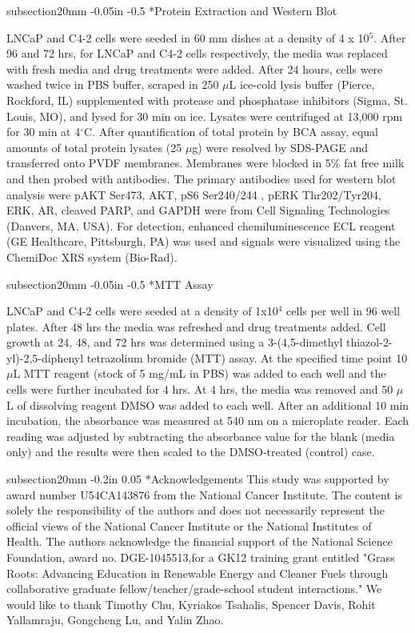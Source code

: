 \documentclass[12pt]{article}
\makeatletter
\renewcommand\subsection{\@startsection
	{subsection}{2}{0mm}
	{-0.05in}
	{-0.5\baselineskip}
	{\normalfont\normalsize\bfseries}}
\renewcommand\section{\@startsection
	{subsection}{2}{0mm}
	{-0.2in}
	{0.05\baselineskip}
	{\normalfont\large\bfseries}}
\makeatother
\begin{document}
\subsection*{Protein Extraction and Western Blot}

LNCaP and C4-2 cells were seeded in 60 mm dishes at a density of 4 x 10$^{5}$. After 96 and 72 hrs, for LNCaP and C4-2 cells respectively, the media was replaced with fresh media and drug treatments were added. After 24 hours, cells were washed twice in PBS buffer, scraped in 250 $\mu$L ice-cold lysis buffer (Pierce, Rockford, IL) supplemented with protease and phosphatase inhibitors (Sigma, St. Louis, MO), and lysed for 30 min on ice. Lysates were centrifuged at 13,000 rpm for 30 min at 4$^{\circ}$C. After quantification of total protein by BCA assay, equal amounts of total protein lysates (25 $\mu$g) were resolved by SDS-PAGE and transferred onto PVDF membranes. Membranes were blocked in 5\% fat free milk and then probed with antibodies. The primary antibodies used for western blot analysis were pAKT Ser473, AKT, pS6 Ser240/244 , pERK Thr202/Tyr204, ERK, AR, cleaved PARP, and GAPDH were from Cell Signaling Technologies (Danvers, MA, USA). For detection, enhanced chemiluminescence ECL reagent (GE Healthcare, Pittsburgh, PA) was used and signals were visualized using the ChemiDoc XRS system (Bio-Rad). 

\subsection*{MTT Assay}

LNCaP and C4-2 cells were seeded at a density of 1x10$^{4}$ cells per well in 96 well plates. After 48 hrs the media was refreshed and drug treatments added. Cell growth at 24, 48, and 72 hrs was determined using a 3-(4,5-dimethyl thiazol-2-yl)-2,5-diphenyl tetrazolium bromide (MTT) assay. At the specified time point 10 $\mu$L MTT reagent (stock of 5 mg/mL in PBS) was added to each well and the cells were further incubated for 4 hrs. At 4 hrs, the media was removed and 50 $\mu$L of dissolving reagent DMSO was added to each well. After an additional 10 min incubation, the absorbance was measured at 540 nm on a microplate reader. Each reading was adjusted by subtracting the absorbance value for the blank (media only) and the results were then scaled to the DMSO-treated (control) case. 


\section*{Acknowledgements}
This study was supported by award number U54CA143876 from the National Cancer Institute.
The content is solely the responsibility of the authors and does not necessarily represent the official views of the National Cancer Institute or the National Institutes of Health.
The authors acknowledge the financial support of the National Science Foundation, award no. DGE-1045513,for a GK12 training grant entitled "Grass Roots: Advancing Education in Renewable Energy and Cleaner Fuels through collaborative graduate fellow/teacher/grade-school student interactions."
We would like to thank Timothy Chu, Kyriakos Tsahalis, Spencer Davis, Rohit Yallamraju, Gongcheng Lu, and Yalin Zhao. 
\end{document}
